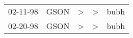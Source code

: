 \begin{supertabular}{lllll}
 02-11-98 &  GSON &  \textgreater &  \textgreater &  bubh \\
 02-20-98 &  GSON &  \textgreater &  \textgreater &  bubh \\
\end{supertabular}
